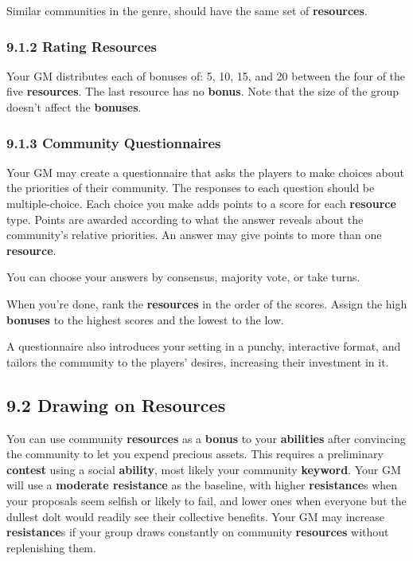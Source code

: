 \documentclass[
  11pt,
]{article}
\begin{document}
Similar communities in the genre, should have the same set of
\textbf{resources}.

\hypertarget{rating-resources}{%
\subsubsection{9.1.2 Rating Resources}\label{rating-resources}}

Your GM distributes each of bonuses of: 5, 10, 15, and 20 between the
four of the five \textbf{resources}. The last resource has no
\textbf{bonus}. Note that the size of the group doesn't affect the
\textbf{bonuses}.

\hypertarget{community-questionnaires}{%
\subsubsection{9.1.3 Community
Questionnaires}\label{community-questionnaires}}

Your GM may create a questionnaire that asks the players to make choices
about the priorities of their community. The responses to each question
should be multiple-choice. Each choice you make adds points to a score
for each \textbf{resource} type. Points are awarded according to what
the answer reveals about the community's relative priorities. An answer
may give points to more than one \textbf{resource}.

You can choose your answers by consensus, majority vote, or take turns.

When you're done, rank the \textbf{resources} in the order of the
scores. Assign the high \textbf{bonuses} to the highest scores and the
lowest to the low.

A questionnaire also introduces your setting in a punchy, interactive
format, and tailors the community to the players' desires, increasing
their investment in it.

\hypertarget{drawing-on-resources}{%
\subsection{9.2 Drawing on Resources}\label{drawing-on-resources}}

You can use community \textbf{resources} as a \textbf{bonus} to your
\textbf{abilities} after convincing the community to let you expend
precious assets. This requires a preliminary \textbf{contest} using a
social \textbf{ability}, most likely your community \textbf{keyword}.
Your GM will use a \textbf{moderate resistance} as the baseline, with
higher \textbf{resistance}s when your proposals seem selfish or likely
to fail, and lower ones when everyone but the dullest dolt would readily
see their collective benefits. Your GM may increase \textbf{resistance}s
if your group draws constantly on community \textbf{resources} without
replenishing them.
\end{document}
